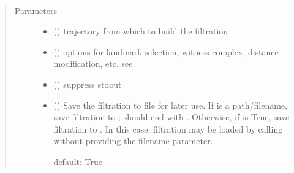 \documentclass[letterpaper,10pt,openany,oneside,english]{sphinxmanual}
\begin{document}
\begin{fulllineitems}
\label{\detokenize{phomology:phomology.Filtration}}~\begin{quote}\begin{description}
\item[{Parameters}] \leavevmode\begin{itemize}
\item {} 
 ({\hyperref[\detokenize{signals:signals.Trajectory}]{}}) \textendash{} trajectory from which to build the filtration

\item {} 
 () \textendash{} options for landmark selection, witness complex, distance
modification, etc.
see {\hyperref[\detokenize{phomology:phomology.build_filtration.build_filtration}]{}}

\item {} 
 (\sphinxstyleliteralemphasis{, }) \textendash{} suppress stdout

\item {} 
 (\sphinxstyleliteralemphasis{, }) \textendash{} 
Save the filtration to file for later use. If  is a
path/filename, save filtration to ;  should end
with . Otherwise, if  is True, save filtration to
. In this case, filtration may be
loaded by calling {\hyperref[\detokenize{phomology:phomology.load_filtration}]{}} without providing the
filename parameter.

default: True


\end{itemize}

\end{description}\end{quote}


\end{fulllineitems}
\end{document}
